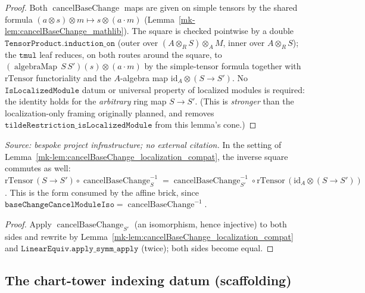 \begin{proof}
  \leanok
  Both \(\operatorname{cancelBaseChange}\) maps are given on simple tensors by the shared formula
  \((a \otimes s) \otimes m \mapsto s \otimes (a \cdot m)\) (Lemma~\ref{mk-lem:cancelBaseChange_mathlib}).
  The square is checked pointwise by a double \(\mathtt{TensorProduct.induction\_on}\) (outer over
  \((A \otimes_R S) \otimes_A M\), inner over \(A \otimes_R S\)); the \(\mathtt{tmul}\) leaf
  reduces, on both routes around the square, to
  \((\operatorname{algebraMap}\,S\,S')(s) \otimes (a \cdot m)\) by the simple-tensor formula together
  with \(\mathrm{rTensor}\) functoriality and the \(A\)-algebra map \(\mathrm{id}_A \otimes (S\to S')\).
  No \(\mathtt{IsLocalizedModule}\) datum or universal property of localized modules is required: the
  identity holds for the \emph{arbitrary} ring map \(S \to S'\). (This is \emph{stronger} than the
  localization-only framing originally planned, and removes
  \(\mathtt{tildeRestriction\_isLocalizedModule}\) from this lemma's cone.)
\end{proof}

\begin{lemma}\label{mk-lem:cancelBaseChange_localization_compat_symm}
  \leanok

  \textit{Source: bespoke project infrastructure; no external citation.}
  In the setting of Lemma~\ref{mk-lem:cancelBaseChange_localization_compat}, the inverse square
  commutes as well:
  \(\mathrm{rTensor}\,(S \to S') \circ \operatorname{cancelBaseChange}_S^{-1}
   = \operatorname{cancelBaseChange}_{S'}^{-1} \circ \mathrm{rTensor}\,(\mathrm{id}_A \otimes (S \to S'))\).
  This is the form consumed by the affine brick, since
  \(\mathtt{baseChangeCancelModuleIso} = \operatorname{cancelBaseChange}^{-1}\).
\end{lemma}
\begin{proof}
  \leanok
  Apply \(\operatorname{cancelBaseChange}_{S'}\) (an isomorphism, hence injective) to both sides and
  rewrite by Lemma~\ref{mk-lem:cancelBaseChange_localization_compat} and
  \(\mathtt{LinearEquiv.apply\_symm\_apply}\) (twice); both sides become equal.
\end{proof}

\subsection{The chart-tower indexing datum (scaffolding)}

